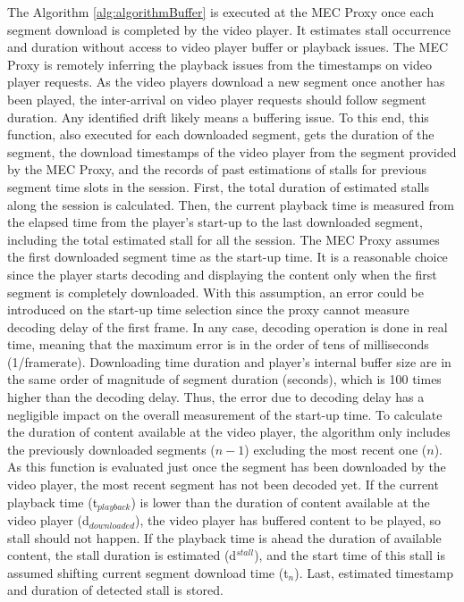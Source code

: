 The Algorithm \ref{alg:algorithmBuffer} is executed at the MEC Proxy once each segment download is completed by the video player. It estimates stall occurrence and duration without access to video player buffer or playback issues. The MEC Proxy is remotely inferring the playback issues from the timestamps on video player requests. As the video players download a new segment once another has been played, the inter-arrival on video player requests should follow segment duration. Any identified drift likely means a buffering issue. To this end, this function, also executed for each downloaded segment, gets the duration of the segment, the download timestamps of the video player from the segment provided by the MEC Proxy, and the records of past estimations of stalls for previous segment time slots in the session. First, the total duration of estimated stalls along the session is calculated.
Then, the current playback time is measured from the elapsed time from the player's start-up to the last downloaded segment, including the total estimated stall for all the session. The MEC Proxy assumes the first downloaded segment time as the start-up time. It is a reasonable choice since the player starts decoding and displaying the content only when the first segment is completely downloaded. With this assumption, an error could be introduced on the start-up time selection since the proxy cannot measure decoding delay of the first frame. In any case, decoding operation is done in real time, meaning that the maximum error is in the order of tens of milliseconds (1/framerate). Downloading time duration and player's internal buffer size are in the same order of magnitude of segment duration (seconds), which is 100 times higher than the decoding delay. Thus, the error due to decoding delay has a negligible impact on the overall measurement of the start-up time.
To calculate the duration of content available at the video player, the algorithm only includes the previously downloaded segments ($n-1$) excluding the most recent one ($n$). As this function is evaluated just once the segment has been downloaded by the video player, the most recent segment has not been decoded yet. If the current playback time (t$_{playback}$) is lower than the duration of content available at the video player (d$_{downloaded}$), the video player has buffered content to be played, so stall should not happen. If the playback time is ahead the duration of available content, the stall duration is estimated (d$^{stall}$), and the start time of this stall is assumed shifting current segment download time (t$_n$). Last, estimated timestamp and duration of detected stall is stored.

